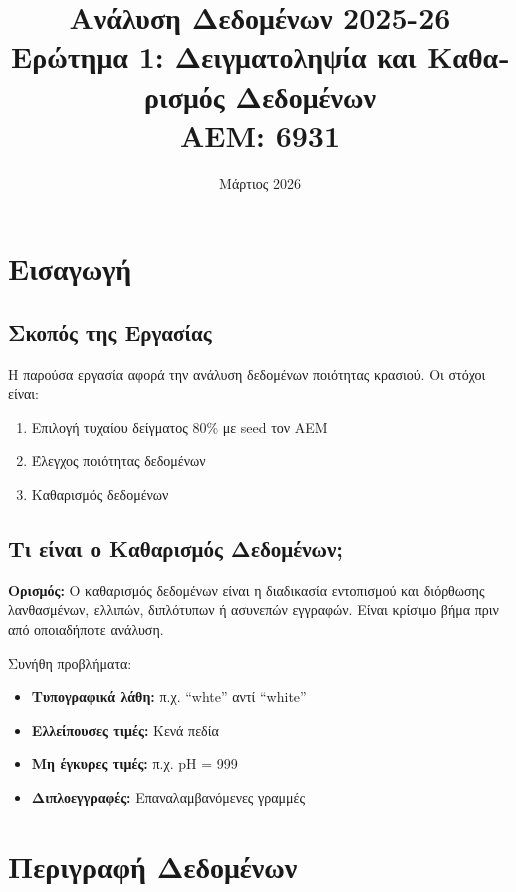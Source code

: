 \documentclass[12pt,a4paper]{article}
\title{
    \textbf{\textgreek{Ανάλυση Δεδομένων} 2025-26}\\[0.3cm]
    \large \textgreek{Ερώτημα 1: Δειγματοληψία και Καθαρισμός Δεδομένων}\\[0.2cm]
    \normalsize AEM: 6931
}
\author{}
\date{\textgreek{Μάρτιος} 2026}
\begin{document}
\maketitle
\tableofcontents
\newpage

\section{\textgreek{Εισαγωγή}}

\subsection{\textgreek{Σκοπός της Εργασίας}}

\textgreek{Η παρούσα εργασία αφορά την ανάλυση δεδομένων ποιότητας κρασιού. Οι στόχοι είναι:}

\begin{enumerate}
    \item \textgreek{Επιλογή τυχαίου δείγματος 80\% με seed τον ΑΕΜ}
    \item \textgreek{Έλεγχος ποιότητας δεδομένων}
    \item \textgreek{Καθαρισμός δεδομένων}
\end{enumerate}

\subsection{\textgreek{Τι είναι ο Καθαρισμός Δεδομένων;}}

\textbf{\textgreek{Ορισμός:}} \textgreek{Ο καθαρισμός δεδομένων είναι η διαδικασία εντοπισμού και διόρθωσης λανθασμένων, ελλιπών, διπλότυπων ή ασυνεπών εγγραφών. Είναι κρίσιμο βήμα πριν από οποιαδήποτε ανάλυση.}

\textgreek{Συνήθη προβλήματα:}
\begin{itemize}
    \item \textbf{\textgreek{Τυπογραφικά λάθη:}} \textgreek{π.χ. ``whte'' αντί ``white''}
    \item \textbf{\textgreek{Ελλείπουσες τιμές:}} \textgreek{Κενά πεδία}
    \item \textbf{\textgreek{Μη έγκυρες τιμές:}} \textgreek{π.χ. pH = 999}
    \item \textbf{\textgreek{Διπλοεγγραφές:}} \textgreek{Επαναλαμβανόμενες γραμμές}
\end{itemize}

\section{\textgreek{Περιγραφή Δεδομένων}}
\end{document}
